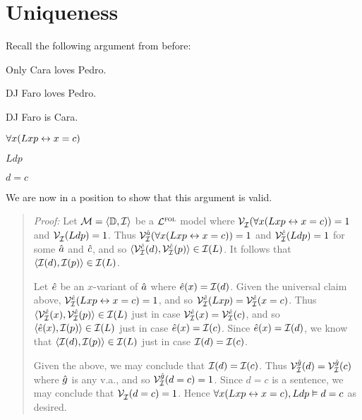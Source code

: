 \section{Uniqueness}

Recall the following argument from before:

\begin{multicols}{2}

\begin{earg}
  \item[] Only Cara loves Pedro.
  \item[] DJ Faro loves Pedro.
  \item[\therefore] DJ Faro is Cara.
\end{earg}

\begin{earg}
  \item[] $\forall x(Lxp \leftrightarrow x=c)$
  \item[] $Ldp$
  \item[\therefore] $d=c$
\end{earg}

\end{multicols}

We are now in a position to show that this argument is valid.

\begin{quote}
\label{unique1}
  \textit{Proof:}
  Let $\mathcal{M}=\langle\mathbb{D},\mathcal{I}\rangle$ be a $\mathcal{L}^{\textsc{fol}}$ model where $\mathcal{V}_{\mathcal{I}}^{}(\forall x(Lxp \leftrightarrow x=c))=1$ and $\mathcal{V}_{\mathcal{I}}^{}(Ldp)=1$.
  Thus $\mathcal{V}_{\mathcal{I}}^{\hat{a}}(\forall x(Lxp \leftrightarrow x=c))=1$ and $\mathcal{V}_{\mathcal{I}}^{\hat{c}}(Ldp)=1$ for some $\hat{a}$ and $\hat{c}$, and so $\langle\mathcal{V}_{\mathcal{I}}^{\hat{c}}(d),\mathcal{V}_{\mathcal{I}}^{\hat{c}}(p)\rangle\in\mathcal{I}(L)$.
  It follows that $\langle\mathcal{I}(d),\mathcal{I}(p)\rangle\in\mathcal{I}(L)$.

  Let $\hat{e}$ be an $x$-variant of $\hat{a}$ where $\hat{e}(x)=\mathcal{I}(d)$.
  Given the universal claim above, $\mathcal{V}_{\mathcal{I}}^{\hat{e}}(Lxp \leftrightarrow x=c)=1$, and so $\mathcal{V}_{\mathcal{I}}^{\hat{e}}(Lxp)=\mathcal{V}_{\mathcal{I}}^{\hat{e}}(x=c)$.
  Thus $\langle\mathcal{V}_{\mathcal{I}}^{\hat{e}}(x),\mathcal{V}_{\mathcal{I}}^{\hat{e}}(p)\rangle\in\mathcal{I}(L)$ just in case $\mathcal{V}_{\mathcal{I}}^{\hat{e}}(x)=\mathcal{V}_{\mathcal{I}}^{\hat{e}}(c)$, and so $\langle\hat{e}(x),\mathcal{I}(p)\rangle\in\mathcal{I}(L)$ just in case $\hat{e}(x)=\mathcal{I}(c)$.
  Since $\hat{e}(x)=\mathcal{I}(d)$, we know that $\langle\mathcal{I}(d),\mathcal{I}(p)\rangle\in\mathcal{I}(L)$ just in case $\mathcal{I}(d)=\mathcal{I}(c)$.

  Given the above, we may conclude that $\mathcal{I}(d)=\mathcal{I}(c)$.
  Thus $\mathcal{V}_{\mathcal{I}}^{\hat{g}}(d)=\mathcal{V}_{\mathcal{I}}^{\hat{g}}(c)$ where $\hat{g}$ is any v.a., and so $\mathcal{V}_{\mathcal{I}}^{\hat{g}}(d=c)=1$.
  Since $d=c$ is a sentence, we may conclude that $\mathcal{V}_{\mathcal{I}}^{}(d=c)=1$. 
  Hence $\forall x(Lxp \leftrightarrow x=c), Ldp \vDash d=c$ as desired. 
\end{quote}

